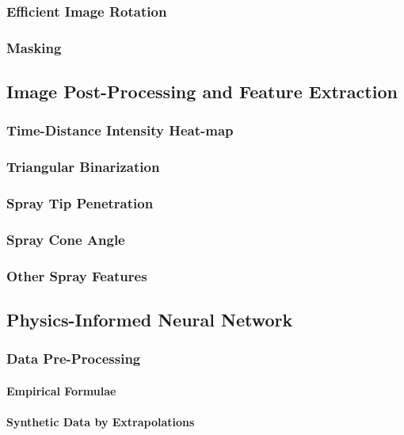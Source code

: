 \documentclass[english, 12pt, a4paper, elec, utf8, a-2b, online]{aaltothesis}
\begin{document}
\subsubsection{Efficient Image Rotation}

\subsubsection{Masking}

\subsection{Image Post-Processing and Feature Extraction} 
\subsubsection{Time-Distance Intensity Heat-map}
\subsubsection{Triangular Binarization}

\subsubsection{Spray Tip Penetration}
\subsubsection{Spray Cone Angle}
\subsubsection{Other Spray Features}

\subsection{Physics-Informed Neural Network}
\subsubsection{Data Pre-Processing}
\paragraph{Empirical Formulae}
\paragraph{Synthetic Data by Extrapolations}
\end{document}
